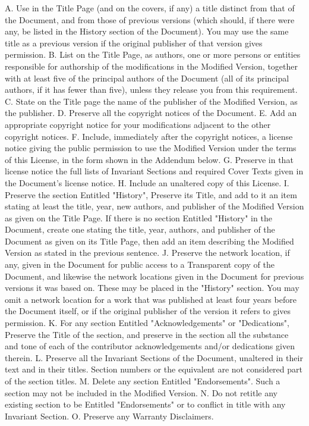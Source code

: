 \documentclass[11pt]{article}
\begin{document}
A. Use in the Title Page (and on the covers, if any) a title distinct
   from that of the Document, and from those of previous versions
   (which should, if there were any, be listed in the History section
   of the Document).  You may use the same title as a previous version
   if the original publisher of that version gives permission.
B. List on the Title Page, as authors, one or more persons or entities
   responsible for authorship of the modifications in the Modified
   Version, together with at least five of the principal authors of the
   Document (all of its principal authors, if it has fewer than five),
   unless they release you from this requirement.
C. State on the Title page the name of the publisher of the
   Modified Version, as the publisher.
D. Preserve all the copyright notices of the Document.
E. Add an appropriate copyright notice for your modifications
   adjacent to the other copyright notices.
F. Include, immediately after the copyright notices, a license notice
   giving the public permission to use the Modified Version under the
   terms of this License, in the form shown in the Addendum below.
G. Preserve in that license notice the full lists of Invariant Sections
   and required Cover Texts given in the Document's license notice.
H. Include an unaltered copy of this License.
I. Preserve the section Entitled "History", Preserve its Title, and add
   to it an item stating at least the title, year, new authors, and
   publisher of the Modified Version as given on the Title Page.  If
   there is no section Entitled "History" in the Document, create one
   stating the title, year, authors, and publisher of the Document as
   given on its Title Page, then add an item describing the Modified
   Version as stated in the previous sentence.
J. Preserve the network location, if any, given in the Document for
   public access to a Transparent copy of the Document, and likewise
   the network locations given in the Document for previous versions
   it was based on.  These may be placed in the "History" section.
   You may omit a network location for a work that was published at
   least four years before the Document itself, or if the original
   publisher of the version it refers to gives permission.
K. For any section Entitled "Acknowledgements" or "Dedications",
   Preserve the Title of the section, and preserve in the section all
   the substance and tone of each of the contributor acknowledgements
   and/or dedications given therein.
L. Preserve all the Invariant Sections of the Document,
   unaltered in their text and in their titles.  Section numbers
   or the equivalent are not considered part of the section titles.
M. Delete any section Entitled "Endorsements".  Such a section
   may not be included in the Modified Version.
N. Do not retitle any existing section to be Entitled "Endorsements"
   or to conflict in title with any Invariant Section.
O. Preserve any Warranty Disclaimers.
\end{document}

